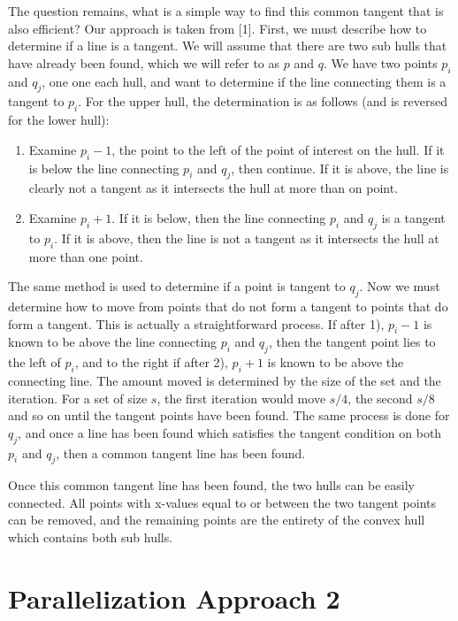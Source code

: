 \documentclass[conference]{IEEEtran}
\begin{document}
The question remains, what is a simple way to find this common tangent that is also efficient? Our approach is taken from [1]. First, we must describe how to determine if a line is a tangent. We will assume that there are two sub hulls that have already been found, which we will refer to as $p$ and $q$. We have two points $p_i$ and $q_j$, one one each hull, and want to determine if the line connecting them is a tangent to $p_i$. For the upper hull, the determination is as follows (and is reversed for the lower hull):

\begin{enumerate}
    \item Examine $p_i-1$, the point to the left of the point of interest on the hull. If it is below the line connecting $p_i$ and $q_j$, then continue. If it is above, the line is clearly not a tangent as it intersects the hull at more than on point.
    \item Examine $p_i+1$. If it is below, then the line connecting $p_i$ and $q_j$ is a tangent to $p_i$. If it is above, then the line is not a tangent as it intersects the hull at more than one point.
\end{enumerate} 

The same method is used to determine if a point is tangent to $q_j$. Now we must determine how to move from points that do not form a tangent to points that do form a tangent. This is actually a straightforward process. If after 1), $p_i-1$ is known to be above the line connecting $p_i$ and $q_j$, then the tangent point lies to the left of $p_i$, and to the right if after 2), $p_i+1$ is known to be above the connecting line. The amount moved is determined by the size of the set and the iteration. For a set of size $s$, the first iteration would move $s/4$, the second $s/8$ and so on until the tangent points have been found. The same process is done for $q_j$, and once a line has been found which satisfies the tangent condition on both $p_i$ and $q_j$, then a common tangent line has been found.

Once this common tangent line has been found, the two hulls can be easily connected. All points with x-values equal to or between the two tangent points can be removed, and the remaining points are the entirety of the convex hull which contains both sub hulls.

\section{Parallelization Approach 2}
\end{document}
